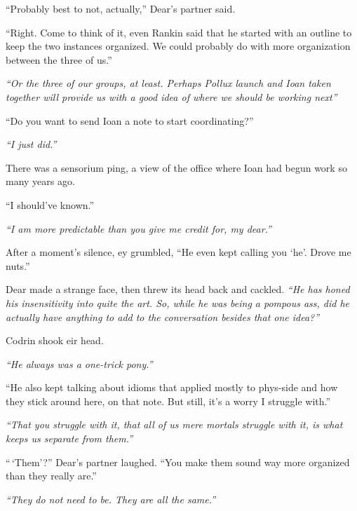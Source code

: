 ``Probably best to not, actually,'' Dear's partner said.

``Right. Come to think of it, even Rankin said that he started with an outline to keep the two instances organized. We could probably do with more organization between the three of us.''

\emph{``Or the three of our groups, at least. Perhaps Pollux launch and Ioan taken together will provide us with a good idea of where we should be working next''}

``Do you want to send Ioan a note to start coordinating?''

\emph{``I just did.''}

There was a sensorium ping, a view of the office where Ioan had begun work so many years ago.

``I should've known.''

\emph{``I am more predictable than you give me credit for, my dear.''}

After a moment's silence, ey grumbled, ``He even kept calling you `he'. Drove me nuts.''

Dear made a strange face, then threw its head back and cackled. \emph{``He has honed his insensitivity into quite the art. So, while he was being a pompous ass, did he actually have anything to add to the conversation besides that one idea?''}

Codrin shook eir head.

\emph{``He always was a one-trick pony.''}

``He also kept talking about idioms that applied mostly to phys-side and how they stick around here, on that note. But still, it's a worry I struggle with.''

\emph{``That you struggle with it, that all of us mere mortals struggle with it, is what keeps us separate from them.''}

``\,`Them'?'' Dear's partner laughed. ``You make them sound way more organized than they really are.''

\emph{``They do not need to be. They are all the same.''}
